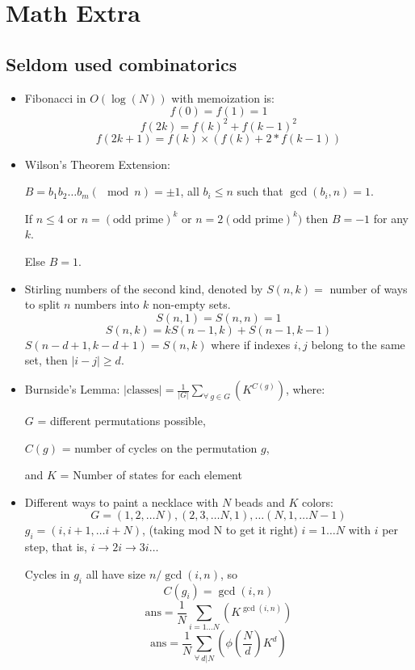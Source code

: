 \section{Math Extra}
\subsection{Seldom used combinatorics}
\begin{itemize}
  \item Fibonacci in $O(\log(N))$ with memoization is:
  $$
   f(0) = f(1) = 1$$$$
   f(2k) = f(k)^2 + f(k - 1)^2$$$$
   f(2k + 1) = f(k) \times (f(k) + 2*f(k - 1))
  $$

  \item Wilson's Theorem Extension: 
  
  $B = b_1 b_2 \ldots b_m (\mod n) = \pm 1$, all 
  $b_i \leq n$ such that $\gcd(b_i, n) = 1$. 
  
  If $n \leq 4$ or $n = (\text{odd prime})^k$ or 
  $n = 2(\text{odd prime})^k)$ then $B = -1$ for any $k$. 
  
  Else $B = 1$.
  
  \item Stirling numbers of the second kind, denoted by $S(n, k) =$ 
  number of ways to split $n$ numbers into $k$ non-empty sets.
  $$
    S(n, 1) = S(n, n) = 1$$$$
    S(n, k) = k S(n - 1, k) + S(n - 1, k - 1)
  $$
  $S(n - d + 1, k - d + 1) = S(n, k)$ where if indexes $i, j$ belong to the same set, then $|i - j| \geq d$.


  \item Burnside's Lemma: $|\text{classes}| = \frac{1}{|G|} \sum_{\forall\ g \in G}(K^{C(g)})$,
  where: 
  
  $G$ = different permutations possible,


  $C(g)$ = number of cycles on the permutation $g$, 
  
  and $K$ = Number of states for each element

  \item Different ways to paint a necklace with $N$ beads and $K$ colors:
  $$G = {(1, 2, \ldots N), (2, 3, \ldots N, 1), \ldots (N, 1, \ldots N - 1)}$$ 
  $g_i = (i, i + 1, \ldots i + N)$, (taking mod N to get it right) $i = 
  1 \ldots N$ with $i$ per step, that is, $i \to 2i \to 3i \ldots$

  Cycles in $g_i$ all have size $n / \gcd(i, n)$, so $$C(g_i) = \gcd(i, n)$$
  $$ \text{ans} = \frac{1}{N} \sum_{i = 1 \ldots N} (K ^ {\gcd(i, n)})$$
  $$ \text{ans} = \frac{1}{N} \sum_{\forall\ d | N}(\phi(\frac{N}{d}) K^d)$$ 
\end{itemize}

